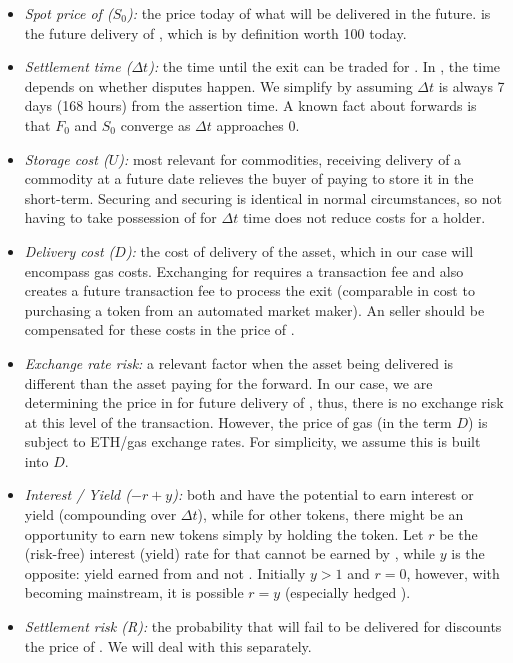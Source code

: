 \begin{itemize}
\item \textit{Spot price of \ethone ($S_0$):} the price today of what will be delivered in the future. \ethxx is the future delivery of \ethone, which is by definition worth 100 \ethone today. 
\item \textit{Settlement time ($\Delta t$):} the time until the exit can be traded for \ethone. In \arb, the time depends on whether disputes happen. We simplify by assuming $\Delta t$ is always 7 days (168 hours) from the assertion time. A known fact about forwards is that $F_0$ and $S_0$ converge as $\Delta t$ approaches 0. 
\item \textit{Storage cost ($U$):} most relevant for commodities, receiving delivery of a commodity at a future date relieves the buyer of paying to store it in the short-term. Securing \ethxx and securing \ethone is identical in normal circumstances, so not having to take possession of \ethone for $\Delta t$ time does not reduce costs for a \ethxx holder. 
\item \textit{Delivery cost ($D$):} the cost of delivery of the asset, which in our case will encompass gas costs. Exchanging \ethone for \ethxx requires a transaction fee and also creates a future transaction fee to process the exit (comparable in cost to purchasing a token from an automated market maker). An \ethone seller should be compensated for these costs in the price of \ethxx.
\item \textit{Exchange rate risk:} a relevant factor when the asset being delivered is different than the asset paying for the forward. In our case, we are determining the price in \ethone for future delivery of \ethone, thus, there is no exchange risk at this level of the transaction. However, the price of gas (in the term $D$) is subject to ETH/gas exchange rates. For simplicity, we assume this is built into $D$.
\item \textit{Interest / Yield ($-r+y$):} both \ethone and \ethxx have the potential to earn interest or yield (compounding over $\Delta t$), while for other tokens, there might be an opportunity to earn new tokens simply by holding the token. Let $r$ be the (risk-free) interest (yield) rate for \ethone that cannot be earned by \ethxx, while $y$ is the opposite: yield earned from \ethxx and not \ethone. Initially $y>1$ and $r=0$, however, with \ethxx becoming mainstream, it is possible $r=y$ (especially hedged \ethxx). 
\item \textit{Settlement risk (R):} the probability that \ethone will fail to be delivered for \ethxx discounts the price of \ethxx. We will deal with this separately.

\end{itemize}

